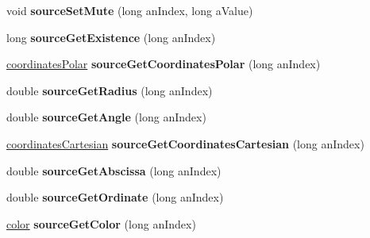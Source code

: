 \begin{DoxyCompactItemize}
\item 
\hypertarget{class_sources_manager_aa98ec5ca058790026211b7adee0afc1c}{void {\bfseries source\-Set\-Mute} (long an\-Index, long a\-Value)}\label{class_sources_manager_aa98ec5ca058790026211b7adee0afc1c}

\item 
\hypertarget{class_sources_manager_a90dd95f2359ade27f1fdcd660e662083}{long {\bfseries source\-Get\-Existence} (long an\-Index)}\label{class_sources_manager_a90dd95f2359ade27f1fdcd660e662083}

\item 
\hypertarget{class_sources_manager_ae412d487a97e866ed490e274fb93122b}{\hyperlink{structcoordinates_polar}{coordinates\-Polar} {\bfseries source\-Get\-Coordinates\-Polar} (long an\-Index)}\label{class_sources_manager_ae412d487a97e866ed490e274fb93122b}

\item 
\hypertarget{class_sources_manager_a69e4fe955e428a047b8a42f7751a696e}{double {\bfseries source\-Get\-Radius} (long an\-Index)}\label{class_sources_manager_a69e4fe955e428a047b8a42f7751a696e}

\item 
\hypertarget{class_sources_manager_af44a7a7c3a35e09acdceb2f4d54cd416}{double {\bfseries source\-Get\-Angle} (long an\-Index)}\label{class_sources_manager_af44a7a7c3a35e09acdceb2f4d54cd416}

\item 
\hypertarget{class_sources_manager_a4c678ada28a26b8f984a65317e41b5a3}{\hyperlink{structcoordinates_cartesian}{coordinates\-Cartesian} {\bfseries source\-Get\-Coordinates\-Cartesian} (long an\-Index)}\label{class_sources_manager_a4c678ada28a26b8f984a65317e41b5a3}

\item 
\hypertarget{class_sources_manager_a58d10292fd97dff90e47a2ad439a36df}{double {\bfseries source\-Get\-Abscissa} (long an\-Index)}\label{class_sources_manager_a58d10292fd97dff90e47a2ad439a36df}

\item 
\hypertarget{class_sources_manager_af4b120f5ff2fabdfebf0e2e95335b068}{double {\bfseries source\-Get\-Ordinate} (long an\-Index)}\label{class_sources_manager_af4b120f5ff2fabdfebf0e2e95335b068}

\item 
\hypertarget{class_sources_manager_a13ac31a92ce15e67a01fc5077e698b87}{\hyperlink{structcolor}{color} {\bfseries source\-Get\-Color} (long an\-Index)}\label{class_sources_manager_a13ac31a92ce15e67a01fc5077e698b87}


\end{DoxyCompactItemize}

